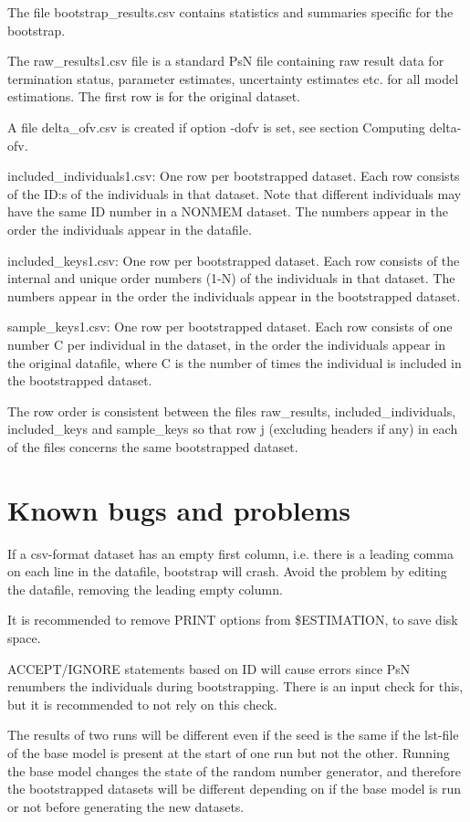 The file bootstrap\_results.csv contains statistics and summaries specific for the bootstrap.

The raw\_results1.csv file is a standard PsN file containing raw result data for termination status, parameter estimates, uncertainty estimates etc. for all model estimations. The first row is for the original dataset.

A file delta\_ofv.csv is created if option -dofv is set, see section Computing delta-ofv.

included\_individuals1.csv: One row per bootstrapped dataset. Each row consists of the ID:s of the individuals in that dataset. Note that different individuals may have the same ID number in a NONMEM dataset. The numbers appear in the order the individuals appear in the datafile.

included\_keys1.csv: One row per bootstrapped dataset. Each row consists of the internal and unique order numbers (1-N) of the individuals in that dataset. The numbers appear in the order the individuals appear in the bootstrapped dataset. 

sample\_keys1.csv:  One row per bootstrapped dataset. Each row consists of one number C per individual in the dataset, in the order the individuals appear in the original datafile, where C is the number of times the individual is included in the bootstrapped dataset. 

The row order is consistent between the files raw\_results, included\_individuals, included\_keys and sample\_keys so that row j (excluding headers if any) in each of the files concerns the same bootstrapped dataset.

\section{Known bugs and problems}

If a csv-format dataset has an empty first column, i.e. there is a leading comma on each line in the datafile, bootstrap will crash. Avoid the problem by editing the datafile, removing the leading empty column.

It is recommended to remove PRINT options from \$ESTIMATION, to save disk space.

ACCEPT/IGNORE statements based on ID will cause errors since PsN renumbers the individuals during bootstrapping. There is an input check for this, but it is recommended to not rely on this check.

The results of two runs will be different even if the seed is the same if the lst-file of the base model is present at the start of one run but not the other. Running the base model changes the state of the random number generator, and therefore the bootstrapped datasets will be different depending on if the base model is run or not before generating the  new datasets. 


